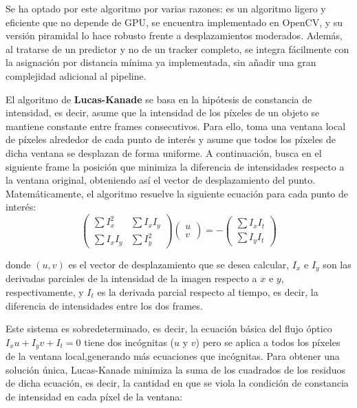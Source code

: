 Se ha optado por este algoritmo por varias razones: es un algoritmo ligero y eficiente que no depende de GPU, se encuentra implementado en OpenCV, y su versión piramidal lo hace robusto frente a desplazamientos moderados. Además, al tratarse de un predictor y no de un tracker completo, se integra fácilmente con la asignación por distancia mínima ya implementada, sin añadir una gran complejidad adicional al pipeline.

El algoritmo de \textbf{Lucas-Kanade} \cite{lucas1981iterative} se basa en la hipótesis de constancia de intensidad, es decir, asume que la intensidad de los píxeles de un objeto se mantiene constante entre frames consecutivos. Para ello, toma una ventana local de píxeles alrededor de cada punto de interés y asume que todos los píxeles de dicha ventana se desplazan de forma uniforme. A continuación, busca en el siguiente frame la posición que minimiza la diferencia de intensidades respecto a la ventana original, obteniendo así el vector de desplazamiento del punto.
Matemáticamente, el algoritmo resuelve la siguiente ecuación para cada punto de interés:
\begin{equation}
    \begin{pmatrix} \sum I_x^2 & \sum I_x I_y \\ \sum I_x I_y & \sum I_y^2 \end{pmatrix}
    \begin{pmatrix} u \\ v \end{pmatrix}
    =
    -\begin{pmatrix} \sum I_x I_t \\ \sum I_y I_t \end{pmatrix}
\end{equation}

donde $(u, v)$ es el vector de desplazamiento que se desea calcular, $I_x$ e $I_y$ son las derivadas parciales de la intensidad de la imagen respecto a $x$ e $y$, respectivamente, y $I_t$ es la derivada parcial respecto al tiempo, es decir, la diferencia de intensidades entre los dos frames.

Este sistema es sobredeterminado, es decir, la ecuación básica del flujo óptico $I_x u + I_y v + I_t = 0$ tiene dos incógnitas ($u$ y $v$) pero se aplica a todos los píxeles de la ventana local,generando más ecuaciones que incógnitas. Para obtener una solución única, Lucas-Kanade minimiza la suma de los cuadrados de los residuos de dicha ecuación, es decir, la cantidad en que se viola la condición de constancia de intensidad en cada píxel de la ventana:


